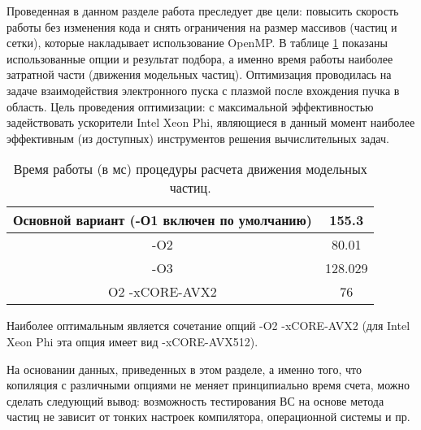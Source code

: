 Проведенная в данном разделе работа преследует две цели: повысить скорость работы без изменения кода и снять ограничения на размер массивов (частиц и сетки), которые накладывает использование OpenMP. В таблице \ref{tabOMPoptions} показаны использованные опции и результат подбора, а именно время работы наиболее затратной части (движения модельных частиц).  Оптимизация проводилась на задаче взаимодействия электронного пуска с плазмой после вхождения пучка в область. Цель проведения оптимизации: с максимальной эффективностью задействовать ускорители Intel Xeon Phi, являющиеся в данный момент наиболее эффективным (из доступных) инструментов решения вычислительных задач.

\begin{table} [htbp]
	\centering
	\changecaptionwidth\captionwidth{15cm}
	\caption{Время работы (в мс) процедуры расчета движения модельных частиц.}\label{tabOMPoptions}%
	\begin{tabular}{| c | c |}
		\hline
	
		Основной вариант (-О1 включен по умолчанию)   &  155.3 \\ \hline
		-O2 &  80.01   \\ \hline
		-O3 &  128.029   \\ \hline
		O2 -xCORE-AVX2 & 76 \\ 
		\hline
	\end{tabular}
\end{table}


Наиболее оптимальным является сочетание опций -O2 -xCORE-AVX2 (для Intel Xeon Phi эта опция имеет вид -xCORE-AVX512).

На основании данных, приведенных в этом разделе, а именно того, что копиляция с различными опциями не меняет принципиально время счета, можно сделать следующий вывод: возможность тестирования ВС на основе метода частиц не зависит от тонких настроек компилятора, операционной системы и пр.  

